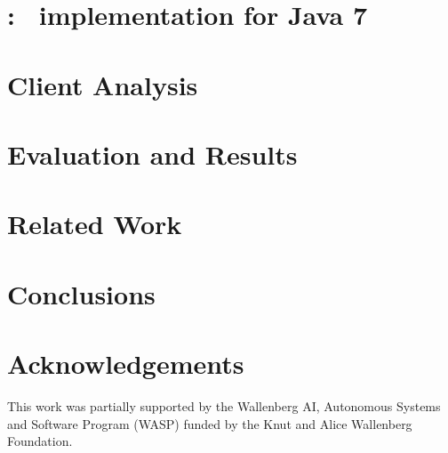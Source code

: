 \section{\intraj: \intracfg\  implementation for Java 7}
\label{sec:implementation}


\section{Client Analysis}
\label{sec:analysis}


\section{Evaluation and Results}
\label{sec:evaluation_results}


\section{Related Work}
\label{sec:related_works}


\section{Conclusions}
\label{sec:conclusions}



\section*{Acknowledgements}

This work was partially supported by the Wallenberg AI, Autonomous Systems and Software Program (WASP) funded by the Knut and Alice Wallenberg Foundation.

{\raggedright
\printbibliography[segment=\therefsegment,heading=subbibliography]
}

% 
% 





% 
